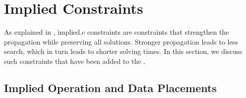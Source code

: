 \section{Implied Constraints}

As explained in , \gls{implied.c}
\glspl{constraint} are \glspl{constraint} that strengthen the \gls{propagation}
while preserving all \glspl{solution}.
%
Stronger \gls{propagation} leads to less \gls{search}, which in turn leads to
shorter solving times.
%
In this section, we discuss such \glspl{constraint} that have been added to the
.


\subsection{Implied Operation and Data Placements}

